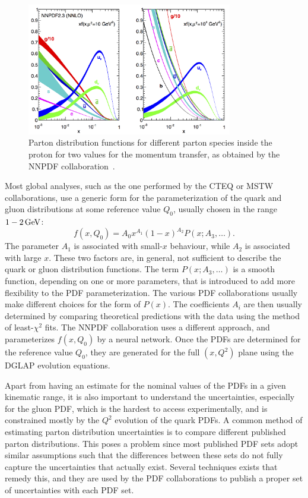 \begin{figure}[tpb]
  \centering
  \includegraphics[width=0.8\textwidth]{figures/eventreco_event/nnpdf23_nnlo_allpdfs}
  \caption{Parton distribution functions for different parton species inside the proton for two
values for the momentum transfer, as obtained by the \textsc{NNPDF}
collaboration~\cite{NNPDF_website,Ball:2012cx}. 
  \label{fig:NNPDF}}
\end{figure}

Most global analyses, such as the one performed by the \textsc{CTEQ} or \textsc{MSTW}
collaborations, use a generic form for the parameterization of the quark and gluon distributions at
some reference value $Q_0$, usually chosen in the range $1-2\,\text{Ge\hspace{-.08em}V}$:
\begin{equation}
  f(x,Q_0) = A_0 x^{A_1} (1-x)^{A_2} P(x; A_3, \ldots) .
\end{equation}
The parameter $A_1$ is associated with small-$x$ behaviour, while $A_2$ is associated with
large $x$. These two factors are, in general, not sufficient to describe the quark or gluon
distribution functions. The term $P(x; A_3, \ldots)$ is a smooth function, depending on one or more
parameters, that is introduced to add more flexibility to the PDF parameterization. The various PDF
collaborations usually make different choices for the form of $P(x)$. 
The coefficients $A_i$ are then usually determined by comparing theoretical predictions with the
data using the method of least-$\chi^2$ fits. 
The \textsc{NNPDF} collaboration uses a different approach, and parameterizes $f(x,Q_0)$ by a
neural network. 
Once the PDFs are determined for the reference value $Q_0$, they are generated for the full
$(x,Q^2)$ plane using the DGLAP evolution equations. 

Apart from having an estimate for the nominal values of the PDFs in a given kinematic range, it is
also important to understand the uncertainties, especially for the gluon PDF, which is the hardest
to access experimentally, and is constrained mostly by the $Q^2$ evolution of the quark PDFs. 
A common method of estimating parton distribution uncertainties is to compare different published
parton distributions. This poses a problem since most published PDF sets adopt similar
assumptions such that the differences between these sets do not fully capture the uncertainties that
actually exist. Several techniques exists that remedy this, and they are used by the PDF
collaborations to publish a proper set of uncertainties with each PDF set.  



